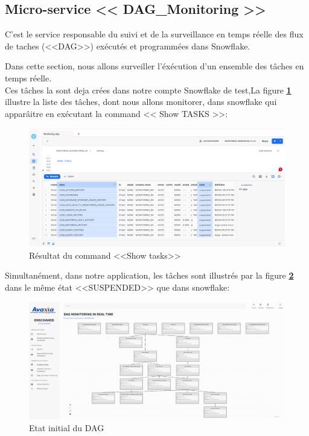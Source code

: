 \subsection{Micro-service << DAG\_Monitoring >>}
\par C'est le service responsable du suivi et de la surveillance en temps réelle des flux de taches (<<DAG>>) exécutés et programmées dans Snowflake. 
\par Dans cette section, nous allons surveiller l'éxécution d'un ensemble des tâches en temps réelle. 
\\ Ces tâches la sont deja crées dans notre compte Snowflake de test,La figure \textbf{\ref{fig:show}} illustre la liste des tâches, dont nous allons monitorer, dans snowflake qui apparâitre en exécutant la command << Show TASKS >>:
    \begin{figure}[H]
            \centering
            \includegraphics[width =1\linewidth]{img/captures/dag/show.PNG}
            \caption{Résultat du command <<Show tasks>> }
                \label{fig:show}
        \end{figure}
    \par Simultanément, dans notre application, les tâches sont illustrés par la figure \textbf{\ref{fig:sus}} dans le même état <<SUSPENDED>> que dans snowflake:
    \begin{figure}[H]
        \centering
        \includegraphics[width =1\linewidth]{img/captures/dag/1/ok/0.png}
        \caption{Etat initial du DAG}
            \label{fig:sus}
    \end{figure}

